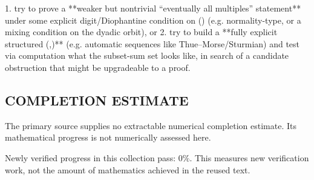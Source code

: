 1. try to prove a **weaker but nontrivial “eventually all multiples” statement** under some explicit digit/Diophantine condition on (\alpha) (e.g. normality-type, or a mixing condition on the dyadic orbit), or
2. try to build a **fully explicit structured (\alpha,\beta)** (e.g. automatic sequences like Thue–Morse/Sturmian) and test via computation what the subset-sum set looks like, in search of a candidate obstruction that might be upgradeable to a proof.


\subsection*{COMPLETION ESTIMATE}
The primary source supplies no extractable numerical completion estimate. Its mathematical progress is not numerically assessed here.

Newly verified progress in this collection pass: $0\%$. This measures new verification work, not the amount of mathematics achieved in the reused text.
